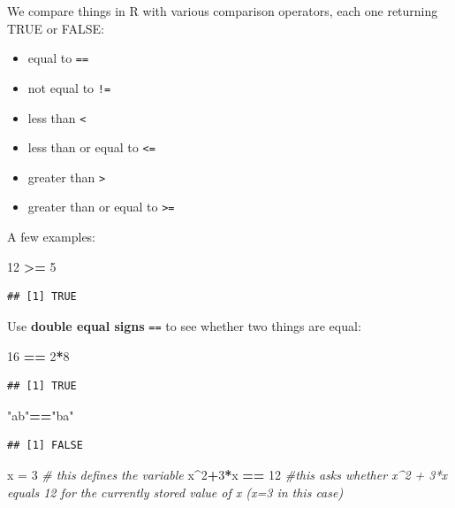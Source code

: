 \documentclass[
]{book}
\newenvironment{Shaded}{\begin{snugshade}}{\end{snugshade}}
\newcommand{\CommentTok}[1]{\textcolor[rgb]{0.56,0.35,0.01}{\textit{#1}}}
\newcommand{\DecValTok}[1]{\textcolor[rgb]{0.00,0.00,0.81}{#1}}
\newcommand{\NormalTok}[1]{#1}
\newcommand{\OtherTok}[1]{\textcolor[rgb]{0.56,0.35,0.01}{#1}}
\newcommand{\SpecialCharTok}[1]{\textcolor[rgb]{0.81,0.36,0.00}{\textbf{#1}}}
\newcommand{\StringTok}[1]{\textcolor[rgb]{0.31,0.60,0.02}{#1}}
\providecommand{\tightlist}{%
  \setlength{\itemsep}{0pt}\setlength{\parskip}{0pt}}
\theoremstyle{definition}
\theoremstyle{definition}
\theoremstyle{definition}
\theoremstyle{definition}
\theoremstyle{remark}
\begin{document}
We compare things in R with various comparison operators, each one returning TRUE or FALSE:

\begin{itemize}
\tightlist
\item
  equal to \texttt{==}
\item
  not equal to \texttt{!=}
\item
  less than \texttt{\textless{}}
\item
  less than or equal to \texttt{\textless{}=}
\item
  greater than \texttt{\textgreater{}}
\item
  greater than or equal to \texttt{\textgreater{}=}
\end{itemize}

A few examples:

\begin{Shaded}
\begin{Highlighting}[]
\DecValTok{12} \SpecialCharTok{\textgreater{}=} \DecValTok{5}
\end{Highlighting}
\end{Shaded}

\begin{verbatim}
## [1] TRUE
\end{verbatim}

Use \textbf{double equal signs} \texttt{==} to see whether two things are equal:

\begin{Shaded}
\begin{Highlighting}[]
\DecValTok{16} \SpecialCharTok{==} \DecValTok{2}\SpecialCharTok{*}\DecValTok{8}
\end{Highlighting}
\end{Shaded}

\begin{verbatim}
## [1] TRUE
\end{verbatim}

\begin{Shaded}
\begin{Highlighting}[]
\StringTok{"ab"}\SpecialCharTok{==}\StringTok{"ba"}
\end{Highlighting}
\end{Shaded}

\begin{verbatim}
## [1] FALSE
\end{verbatim}

\begin{Shaded}
\begin{Highlighting}[]
\NormalTok{x }\OtherTok{=} \DecValTok{3} \CommentTok{\# this defines the variable}
\NormalTok{x}\SpecialCharTok{\^{}}\DecValTok{2}\SpecialCharTok{+}\DecValTok{3}\SpecialCharTok{*}\NormalTok{x }\SpecialCharTok{==} \DecValTok{12} \CommentTok{\#this asks whether x\^{}2 + 3*x equals 12 for the currently stored value of x (x=3 in this case)}
\end{Highlighting}
\end{Shaded}
\end{document}
